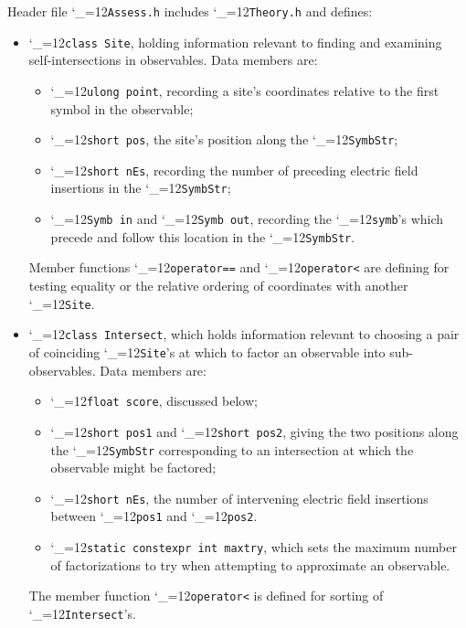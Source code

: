 \documentclass [12pt]{article}
\makeatletter
\renewcommand{\tt}{\begingroup\catcode`_=12\def\_{\string_}\tt@}
\newcommand{\tt@}[1]{\texttt{#1}\endgroup}
\makeatother
\begin{document}
Header file \tt{Assess.h} includes \tt{Theory.h}
and defines:
\begin{itemize}
\item
    \tt{class Site}, holding information relevant to finding
    and examining self-intersections in observables.
    Data members are:
    \begin{itemize}
    \item
    \tt{ulong point}, recording a site's coordinates
    relative to the first symbol in the observable;
    \item
    \tt{short pos}, the site's position along the \tt{SymbStr};
    \item
    \tt{short nEs}, recording
    the number of preceding electric field insertions
    in the \tt{SymbStr};
    \item
    \tt{Symb in} and \tt{Symb out}, recording the \tt{symb}'s
    which precede and follow this location in the \tt{SymbStr}.
    \end{itemize}
    Member functions
    \tt{operator==} and
    \tt{operator<} are defining for testing equality
    or the relative ordering of coordinates with another \tt{Site}.

\item
    \tt{class Intersect}, which holds information relevant to
    choosing a pair of coinciding \tt{Site}'s at which to
    factor an observable into sub-observables.
    Data members are:
    \begin{itemize}
    \item
    \tt{float score}, discussed below;
    \item
    \tt{short pos1} and \tt{short pos2}, giving the
    two positions along the \tt{SymbStr} corresponding to
    an intersection at which the observable might be factored;
    \item
    \tt{short nEs},
    the number of intervening electric field insertions between
    \tt{pos1} and \tt{pos2}.
    \item
    \tt{static constexpr int maxtry}, which sets the
    maximum number of factorizations to try when
    attempting to approximate an observable.
    \end{itemize}
    The member function \tt{operator<} is defined
    for sorting of \tt{Intersect}'s.

\end{itemize}
\end{document}

